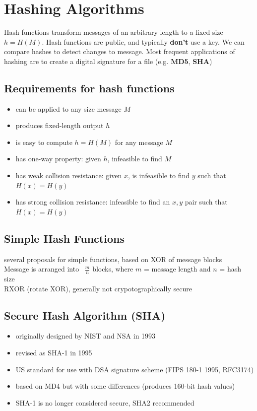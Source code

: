 \documentclass{article}
\begin{document}
\section{Hashing Algorithms}
Hash functions transform messages of an arbitrary length to a fixed size $h = H(M)$. Hash functions are public, and typically \textbf{don't} use a key. We can compare hashes to detect changes to message. Most frequent applications of hashing are to create a digital signature for a file (e.g. \textbf{MD5}, \textbf{SHA})
\subsection{Requirements for hash functions}
\begin{itemize}
    \item can be applied to any size message $M$
    \item produces fixed-length output $h$
    \item is easy to compute $h = H(M)$ for any message $M$
    \item has one-way property: given $h$, infeasible to find $M$
    \item has weak collision resistance: given $x$, is infeasible to find $y$ such that $H(x) = H(y)$
    \item has strong collision resistance: infeasible to find an $x,y$ pair such that $H(x) = H(y)$
\end{itemize}
\subsection{Simple Hash Functions}
several proposals for simple functions, based on XOR of message blocks
\\Message is arranged into ~$ \frac{m}{n} $ blocks, where $m$ = message length and $n$ = hash size
\\RXOR (rotate XOR), generally not crypotographically secure
\subsection{Secure Hash Algorithm (SHA)}
\begin{itemize}
    \item originally designed by NIST and NSA in 1993
    \item revised as SHA-1 in 1995
    \item US standard for use with DSA signature scheme (FIPS 180-1 1995, RFC3174)
    \item based on MD4 but with some differences (produces 160-bit hash values)
    \item SHA-1 is no longer considered secure, SHA2 recommended
\end{itemize}
\end{document}
